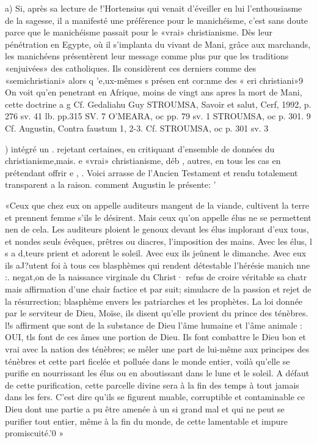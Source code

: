 a)	Si, après sa lecture de !'Hortensius qui venait d'éveiller en lui l'enthousiasme de la sagesse, il a manifesté une préférence pour le manichéisme, c'est sans doute parce que le manichéisme passait pour le «vrai» christianisme. Dès leur pénétration en Egypte, où il s'implanta du vivant de Mani, grâce aux marchands, les manichéens présentèrent leur message comme plus pur que les traditions «enjuivées» des catholiques. Ils considèrent ces derniers comme  des «semichristiani» alors q 'e,ux-mêmes s présen ent cor:nme des « eri christiani»9  On voit	qu'en penetrant en Afrique, moins de vingt ans apres la mort de Mani, cette doctrine a
g Cf. Gedaliahu Guy STROUMSA, Savoir et salut, Cerf, 1992, p. 276 sv.
41 lb. pp.315 SV.
7 O'MEARA, oc pp. 79 sv.
1 STROUMSA, oc p. 301.
9 Cf. Augustin, Contra faustum 1, 2-3. Cf. STROUMSA, oc p. 301 sv.
3
 
)
intégré	un	.	rejetant certaines, en
critiquant d'ensemble de données du christianisme,mais. e	«vrai» christianisme, déb	,	autres, en tous les cas en prétendant offrir e		,	.	Voici
arrasse de l'Ancien Testament et rendu totalement transparent a la raison.
comment Augustin le présente:	'

«Ceux que chez eux on appelle auditeurs mangent de la viande, cultivent la terre et prennent femme s'ils le désirent. Mais ceux qu'on appelle élus ne se permettent nen de cela. Les auditeurs ploient le genoux devant les élus implorant d'eux tous, et nondes seuls évêques, prêtres ou diacres, l'imposition des mains. Avec les élus, l s a d,teurs prient et adorent le soleil. Avec eux ils jeûnent le dimanche. Avec eux ils aJ?utent foi à tous ces blasphèmes qui rendent détestable l'hérésie manich nne :. negat,on de la naissance virginale du Christ· refus de croire véritable sa chatr mais affirmation d'une chair factice et par suit; simulacre de la passion et rejet de la résurrection; blasphème envers les patriarches et les prophètes. La loi donnée par le serviteur de Dieu, Moïse, ils disent qu'elle provient du prince des ténèbres. l!s affirment que sont de la substance de Dieu l'âme humaine et l'âme animale : OUI, tls
font de ces âmes une portion de Dieu. Ils font combattre le Dieu bon et vrai avec la nation des ténèbres; se mêler une part de lui-même aux principes des ténèbres et cette part ficelée et polluée dans le monde entier, voilà qu'elle se purifie en nourrissant les élus ou en aboutissant dans le lune et le soleil. A défaut de cette purification, cette parcelle divine sera à la fin des temps à tout jamais dans les fers. C'est dire qu'ils se figurent muable, corruptible et contaminable ce Dieu dont une partie a pu être amenée à un si grand mal et qui ne peut se purifier tout entier, même à la fin du monde, de cette lamentable et impure promiscuité.'0 »

